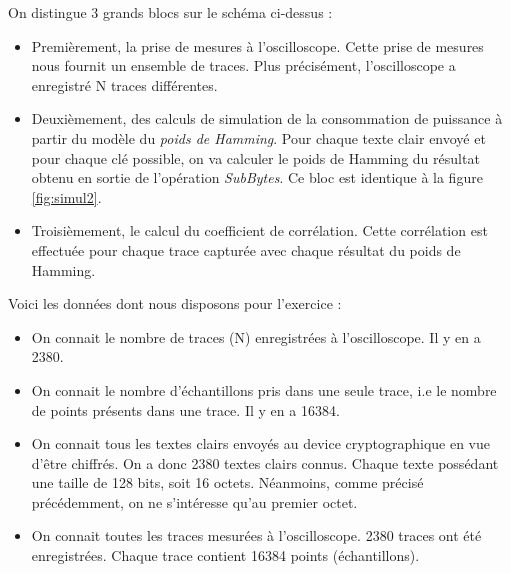 \documentclass[10pt, oneside, a4paper]{article}
\begin{document}
\hspace{-0.5 cm}On distingue 3 grands blocs sur le schéma ci-dessus :
\begin{itemize}
\item Premièrement, la prise de mesures à l'oscilloscope. Cette prise de mesures nous fournit un ensemble de traces. Plus précisément, l'oscilloscope a enregistré N traces différentes.
\item Deuxièmement, des calculs de simulation de la consommation de puissance à partir du modèle du \textit{poids de Hamming}. Pour chaque texte clair envoyé et pour chaque clé possible, on va calculer le poids de Hamming du résultat obtenu en sortie de l'opération \textit{SubBytes}. Ce bloc est identique à la figure \ref{fig:simul2}.
\item Troisièmement, le calcul du coefficient de corrélation. Cette corrélation est effectuée pour chaque trace capturée avec chaque résultat du poids de Hamming. \\
\end{itemize}

\hspace{-0.5 cm}Voici les données dont nous disposons pour l'exercice :
\begin{itemize}
\item On connait le nombre de traces (N) enregistrées à l'oscilloscope. Il y en a 2380.
\item On connait le nombre d'échantillons pris dans une seule trace, i.e le nombre de points présents dans une trace. Il y en a 16384.
\item On connait tous les textes clairs envoyés au device cryptographique en vue d'être chiffrés. On a donc 2380 textes clairs connus. Chaque texte possédant une taille de 128 bits, soit 16 octets. Néanmoins, comme précisé précédemment, on ne s'intéresse qu'au premier octet.
\item On connait toutes les traces mesurées à l'oscilloscope. 2380 traces ont été enregistrées. Chaque trace contient 16384 points (échantillons). \\
\end{itemize}
\end{document}
